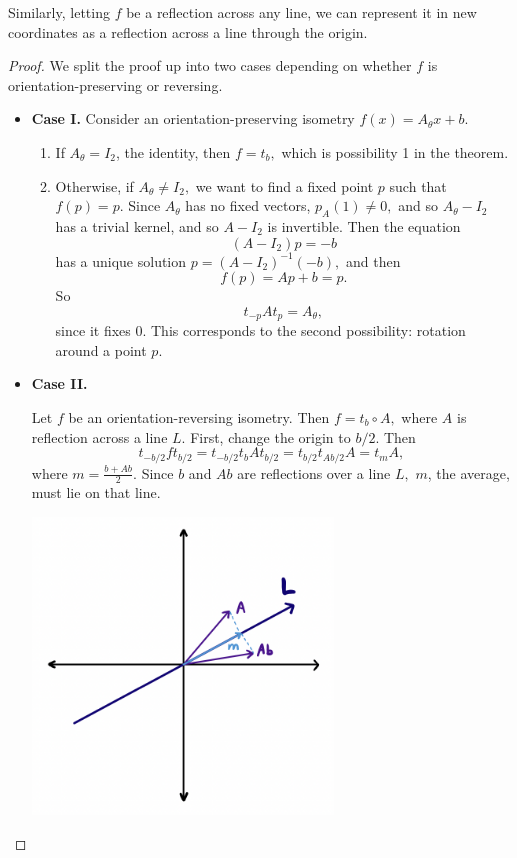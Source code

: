 Similarly, letting $f$ be a reflection across any line, we can represent it in new coordinates as a reflection across a line through the origin. 

\begin{proof} We split the proof up into two cases depending on whether $f$ is orientation-preserving or reversing.
\begin{itemize}
    \item 
\textbf{Case I.}
Consider an orientation-preserving isometry $f(x) = A_{\theta}x + b.$  %

\begin{enumerate}
    \item If $A_{\theta} = I_2$, the identity, then $f = t_b,$ which is possibility 1 in the theorem.

    \item Otherwise, if $A_{\theta} \neq I_2,$ we want to find a fixed point $p$ such that $f(p) = p.$ Since $A_{\theta}$ has no fixed vectors, $p_A(1) \neq 0,$ and so $A_{\theta} - I_2$ has a trivial kernel, and so $A - I_2$ is invertible. Then the equation 
\[
(A-I_2) p = -b
\]
has a unique solution $p = (A-I_2)^{-1}(-b),$ and then 
\[
f(p) = Ap + b = p.
\]
So 
\[
t_{-p} A t_p = A_{\theta},
\]
since it fixes 0. This corresponds to the second possibility: rotation around a point $p.$
\end{enumerate}

\item \textbf{Case II.} 


Let $f$ be an orientation-reversing isometry. Then $f = t_b \circ A,$ where $A$ is reflection across a line $L.$ First, change the origin to $b/2.$ Then 
\[
t_{-b/2} f t_{b/2} = t_{-b/2} t_b A t_{b/2} = t_{b/2} t_{Ab/2} A = t_m A,
\]
where $m = \frac{b + Ab}{2}.$ Since $b$ and $Ab$ are reflections over a line $L,$ $m$, the average, must lie on that line. 
\begin{center}
    \includegraphics[width=8cm]{Lecture Files and Images/lec13-2alt.png}
\end{center}


\end{itemize}
\end{proof}
